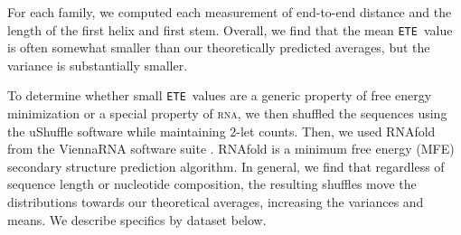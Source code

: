 \documentclass{article}
\newcommand{\RNA}{\textsc{rna}}
\newcommand{\ETE}{{\tt ETE}}
\begin{document}
For each family, we computed each measurement of end-to-end distance and the length of the first helix and first stem.  Overall, we find that the mean \ETE\ value is often somewhat smaller than our theoretically predicted averages, but the variance is substantially smaller.

To determine whether small \ETE\ values are a generic property of free energy minimization or a special property of \RNA, we then shuffled the sequences using the uShuffle software \cite{Jiang:2008} while maintaining $2$-let counts.  Then, we used RNAfold from the ViennaRNA software suite \cite{Lorenz:2011}.  RNAfold is a minimum free energy (MFE) secondary structure prediction algorithm.  In general, we find that regardless of sequence length or nucleotide composition, the resulting shuffles move the distributions towards our theoretical averages, increasing the variances and means.  We describe specifics by dataset below. 
\end{document}
